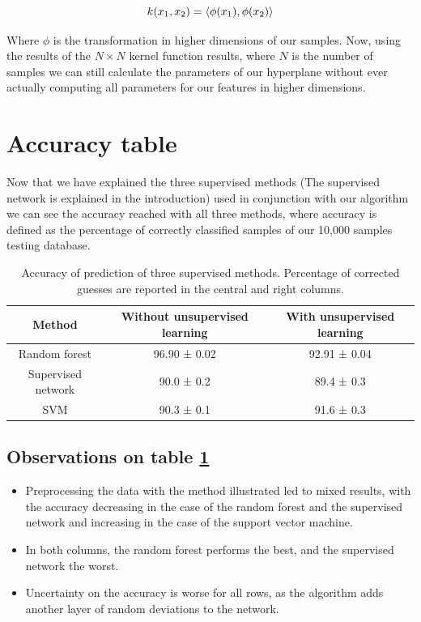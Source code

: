\documentclass[a4paper]{report}
\begin{document}
\begin{equation}
    k(x_1,x_2)= \braket{\phi (x_1),\phi (x_2)}
\end{equation}

Where $\phi$ is the transformation in higher dimensions of our samples.
Now, using the results of the $N \times N$ kernel function results, where $N$ is the number of samples we can still calculate the parameters of our hyperplane without ever actually computing all parameters for our features in higher dimensions.

\section{Accuracy table}

Now that we have explained the three supervised methods (The supervised network is explained in the introduction) used in conjunction with our algorithm we can see the accuracy reached with all three methods, where accuracy is defined as the percentage of correctly classified samples of our 10,000 samples testing database.

\begin{table}[h!]
  \begin{center}
    \caption{Accuracy of prediction of three supervised methods. Percentage of corrected guesses are reported in the central and right columns.}
    \begin{tabular}{c|c|c} %
      \textbf{Method} & \textbf{Without unsupervised learning} & \textbf{With unsupervised learning}\\
      \hline
      Random forest & 96.90  ± 0.02 & 92.91 ± 0.04\\
      Supervised network & 90.0 ± 0.2 & 89.4 ± 0.3 \\
      SVM & 90.3 ± 0.1 & 91.6 ± 0.3 \\
    \end{tabular}
    \label{bbb}
  \end{center}
\end{table}

\subsection{Observations on table \ref{bbb}}

\begin{itemize}
    \item Preprocessing the data with the method illustrated led to mixed results, with the accuracy decreasing in the case of the random forest and the supervised network and increasing in the case of the support vector machine.
    \item In both columns, the random forest performs the best, and the supervised network the worst.
    \item Uncertainty on the accuracy is worse for all rows, as the algorithm adds another layer of random deviations to the network.
\end{itemize}
\end{document}
